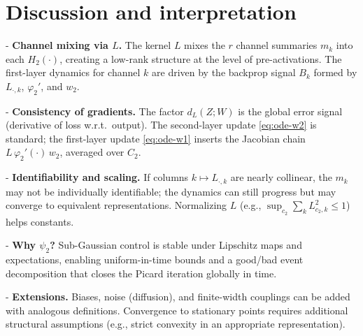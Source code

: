 \documentclass[11pt]{article}
\newcommand{\1}{\mathbbm{1}}
\begin{document}
\section{Discussion and interpretation}

- \textbf{Channel mixing via $L$.} The kernel $L$ mixes the $r$ channel summaries $m_k$ into each $H_2(\cdot)$, creating a low-rank structure at the level of pre-activations. The first-layer dynamics for channel $k$ are driven by the backprop signal $B_k$ formed by $L_{\cdot,k}$, $\varphi_2'$, and $w_2$.

- \textbf{Consistency of gradients.} The factor $d_L(Z;W)$ is the global error signal (derivative of loss w.r.t.\ output). The second-layer update \eqref{eq:ode-w2} is standard; the first-layer update \eqref{eq:ode-w1} inserts the Jacobian chain $L\,\varphi_2'(\cdot)\,w_2$, averaged over $C_2$.

- \textbf{Identifiability and scaling.} If columns $k\mapsto L_{\cdot,k}$ are nearly collinear, the $m_k$ may not be individually identifiable; the dynamics can still progress but may converge to equivalent representations. Normalizing $L$ (e.g., $\sup_{c_2}\sum_k L_{c_2,k}^2\le 1$) helps constants.

- \textbf{Why $\psi_2$?} Sub-Gaussian control is stable under Lipschitz maps and expectations, enabling uniform-in-time bounds and a good/bad event decomposition that closes the Picard iteration globally in time.

- \textbf{Extensions.} Biases, noise (diffusion), and finite-width couplings can be added with analogous definitions. Convergence to stationary points requires additional structural assumptions (e.g., strict convexity in an appropriate representation).
\end{document}
